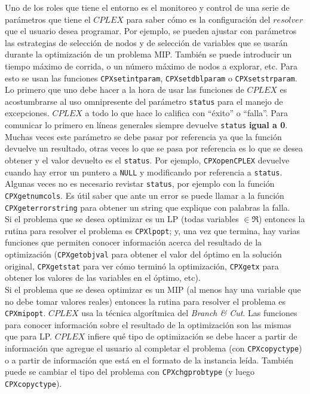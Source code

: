 Uno de los roles que tiene el entorno es el monitoreo y control de una serie de parámetros que tiene el $CPLEX$ para saber cómo es la configuración del $resolver$ que el usuario desea programar. Por ejemplo, se pueden ajustar con parámetros las estrategias de selección de nodos y de selección de variables que se usarán durante la optimización de un problema MIP. También se puede introducir un tiempo máximo de corrida, o un número máximo de nodos a explorar, etc. Para esto se usan las funciones \verb_CPXsetintparam_, \verb_CPXsetdblparam_ o \verb_CPXsetstrparam_.\\

Lo primero que uno debe hacer a la hora de usar las funciones de $CPLEX$ es acostumbrarse al uso omnipresente del parámetro \verb_status_ para el manejo de excepciones. $CPLEX$ a todo lo que hace lo califica con ``éxito'' o ``falla''. Para comunicar lo primero en líneas generales siempre devuelve \verb_status_ \textbf{igual a 0}. Muchas veces este parámetro se debe pasar por referencia ya que la función devuelve un resultado, otras veces lo que se pasa por referencia es lo que se desea obtener y el valor devuelto es el \verb_status_. Por ejemplo, \verb_CPXopenCPLEX_ devuelve cuando hay error un puntero a \verb_NULL_ y modificando por referencia a \verb_status_. Algunas veces no es necesario revistar \verb_status_, por ejemplo con la función \verb_CPXgetnumcols_. Es útil saber que ante un error se puede llamar a la función \verb_CPXgeterrorstring_ para obtener un string que explique con palabras la falla.\\

Si el problema que se desea optimizar es un LP (todas variables $\in\Re$) entonces la rutina para resolver el problema es \verb_CPXlpopt_; y, una vez que termina, hay varias funciones que permiten conocer información acerca del resultado de la optimización (\verb_CPXgetobjval_ para obtener el valor del óptimo en la solución original, \verb_CPXgetstat_ para ver cómo terminó la optimización, \verb_CPXgetx_ para obtener los valores de las variables en el óptimo, etc).\\

Si el problema que se desea optimizar es un MIP (al menos hay una variable que no debe tomar valores reales) entonces la rutina para resolver el problema es \verb_CPXmipopt_. $CPLEX$ usa la técnica algorítmica del \emph{Branch \& Cut}. Las funciones para conocer información sobre el resultado de la optimización son las mismas que para LP. $CPLEX$ infiere qué tipo de optimización se debe hacer a partir de información que agregue el usuario al completar el problema (con \verb_CPXcopyctype_) o a partir de información que está en el formato de la instancia leída. También puede se cambiar el tipo del problema con \verb_CPXchgprobtype_ (y luego \verb_CPXcopyctype_).\\

